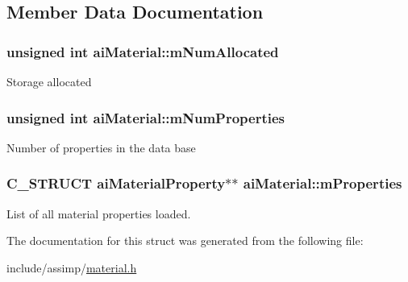 \subsection{\-Member \-Data \-Documentation}
\hypertarget{structaiMaterial_a84a0016a263362c52b27a9d8d76dc449}{
\subsubsection[{m\-Num\-Allocated}]{\setlength{\rightskip}{0pt plus 5cm}unsigned int {\bf ai\-Material\-::m\-Num\-Allocated}}}\label{structaiMaterial_a84a0016a263362c52b27a9d8d76dc449}
\-Storage allocated \hypertarget{structaiMaterial_a243b07afdc6507f8878c93a2cafe4963}{
\subsubsection[{m\-Num\-Properties}]{\setlength{\rightskip}{0pt plus 5cm}unsigned int {\bf ai\-Material\-::m\-Num\-Properties}}}\label{structaiMaterial_a243b07afdc6507f8878c93a2cafe4963}
\-Number of properties in the data base \hypertarget{structaiMaterial_af32b125d54bff5bc1fc54a1007487cab}{
\subsubsection[{m\-Properties}]{\setlength{\rightskip}{0pt plus 5cm}\-C\-\_\-\-S\-T\-R\-U\-C\-T ai\-Material\-Property$\ast$$\ast$ {\bf ai\-Material\-::m\-Properties}}}\label{structaiMaterial_af32b125d54bff5bc1fc54a1007487cab}
\-List of all material properties loaded. 

\-The documentation for this struct was generated from the following file\-:\begin{DoxyCompactItemize}
\item 
include/assimp/\hyperlink{material_8h}{material.\-h}\end{DoxyCompactItemize}
